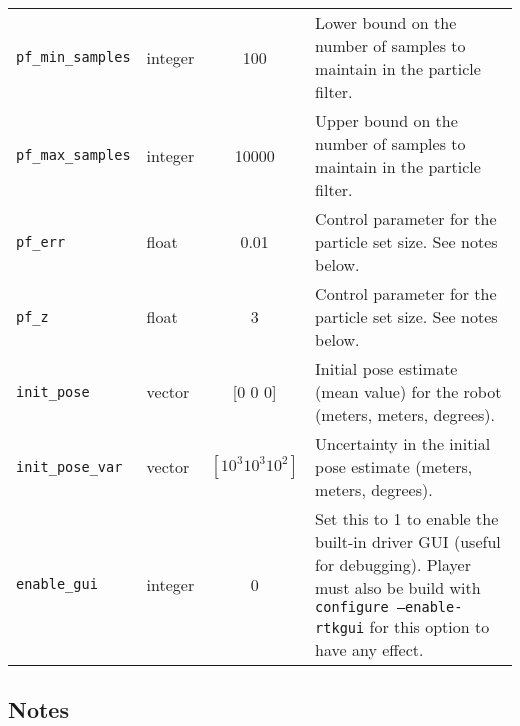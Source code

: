 \begin{center}
{\begin{tabularx}{\columnwidth}{|l|l|c|X|}
{\tt pf\_min\_samples} & integer & 100 & Lower bound on the number of
samples to maintain in the particle filter. \\

{\tt pf\_max\_samples} & integer & 10000 & Upper bound on the number of
samples to maintain in the particle filter. \\

{\tt pf\_err} & float & 0.01 & Control parameter for the particle set
size.  See notes below. \\

{\tt pf\_z} & float & 3 & Control parameter for the particle set
size.  See notes below. \\

{\tt init\_pose} & vector & [0 0 0] & Initial pose estimate (mean
value) for the robot (meters, meters, degrees). \\

{\tt init\_pose\_var} & vector & $[10^3 10^3 10^2]$ & Uncertainty in the
initial pose estimate (meters, meters, degrees). \\

{\tt enable\_gui} & integer & 0 & Set this to 1 to enable the built-in
driver GUI (useful for debugging).  Player must also be build with
{\tt configure --enable-rtkgui} for this option to have any effect. \\

\hline
\end{tabularx}}
\end{center}

\subsection*{Notes}

